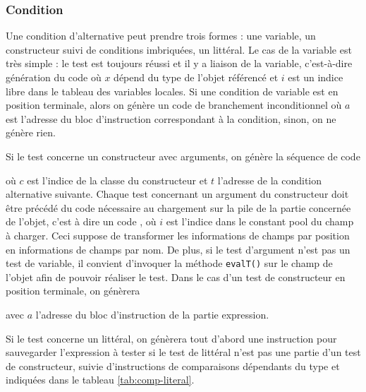 \subsubsection{Condition}
\label{altern:gentest} 

Une condition d'alternative peut prendre trois
formes : une variable, un constructeur suivi de conditions imbriqu\'ees,
un litt\'eral. Le cas de la variable est tr\`es simple : le test est
toujours r\'eussi et il y a liaison de la variable, c'est-\`a-dire
g\'en\'eration du code  o\`u $x$ d\'epend du type
de l'objet r\'ef\'erenc\'e et $i$ est un indice libre dans le tableau des
variables locales. Si une condition de variable est en position
terminale, alors on g\'en\`ere un code de branchement 
inconditionnel  o\`u $a$ est l'adresse du bloc
d'instruction correspondant \`a la condition, sinon, on ne g\'en\`ere rien. 

Si le test concerne un constructeur avec arguments, on g\'en\`ere la s\'equence de code


o\`u $c$ est l'indice de la classe du constructeur et $t$ l'adresse de
la condition alternative suivante. Chaque test concernant un argument
du constructeur doit \^etre pr\'ec\'ed\'e du code n\'ecessaire au chargement sur
la pile de la partie concern\'ee de l'objet, c'est \`a dire un code
, o\`u $i$  est l'indice dans le constant
pool du champ \`a charger. Ceci suppose de transformer les informations
de champs par position en informations de champs par nom. De plus, si
le test d'argument n'est pas un test de variable, il convient
d'invoquer la m\'ethode \texttt{evalT()} sur le champ de l'objet afin de
pouvoir r\'ealiser le test. Dans le cas d'un test de constructeur en position terminale, on g\'en\`erera


avec $a$ l'adresse du bloc d'instruction de la partie expression. 

Si le test concerne un litt\'eral, on g\'en\`erera tout d'abord une
instruction  pour sauvegarder l'expression \`a tester
si le test de litt\'eral n'est pas une partie d'un test de constructeur,
suivie  d'instructions de comparaisons d\'ependants du type et indiqu\'ees dans le tableau
\ref{tab:comp-literal}. 


